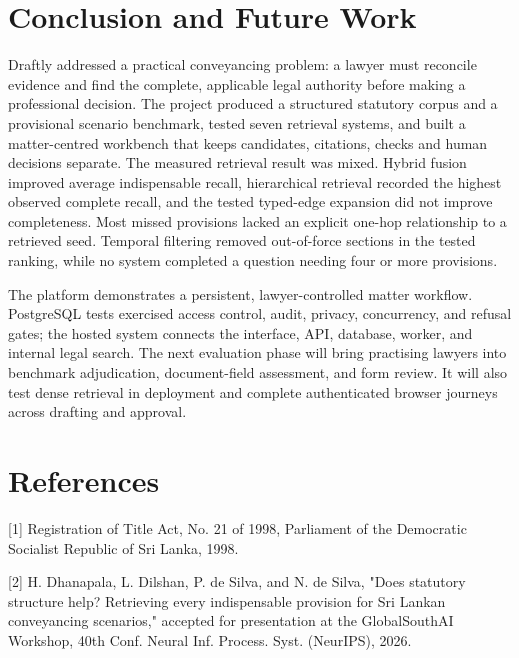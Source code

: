 \documentclass[12pt,a4paper]{article}
\begin{document}
\section{Conclusion and Future Work}

Draftly addressed a practical conveyancing problem: a lawyer must reconcile evidence and find the complete, applicable legal authority before making a professional decision. The project produced a structured statutory corpus and a provisional scenario benchmark, tested seven retrieval systems, and built a matter-centred workbench that keeps candidates, citations, checks and human decisions separate. The measured retrieval result was mixed. Hybrid fusion improved average indispensable recall, hierarchical retrieval recorded the highest observed complete recall, and the tested typed-edge expansion did not improve completeness. Most missed provisions lacked an explicit one-hop relationship to a retrieved seed. Temporal filtering removed out-of-force sections in the tested ranking, while no system completed a question needing four or more provisions.


The platform demonstrates a persistent, lawyer-controlled matter workflow. PostgreSQL tests exercised access control, audit, privacy, concurrency, and refusal gates; the hosted system connects the interface, API, database, worker, and internal legal search. The next evaluation phase will bring practising lawyers into benchmark adjudication, document-field assessment, and form review. It will also test dense retrieval in deployment and complete authenticated browser journeys across drafting and approval.


\clearpage
\section*{References}

\begingroup
\small
\setlength{\parindent}{0pt}
\setlength{\parskip}{4pt}

\hangindent=0.35in  \textnormal{[1]} Registration of Title Act, No. 21 of 1998, Parliament of the Democratic Socialist Republic of Sri Lanka, 1998.\par

\hangindent=0.35in  \textnormal{[2]} H. Dhanapala, L. Dilshan, P. de Silva, and N. de Silva, "Does statutory structure help? Retrieving every indispensable provision for Sri Lankan conveyancing scenarios," accepted for presentation at the GlobalSouthAI Workshop, 40th Conf. Neural Inf. Process. Syst. (NeurIPS), 2026.\par
\end{document}
